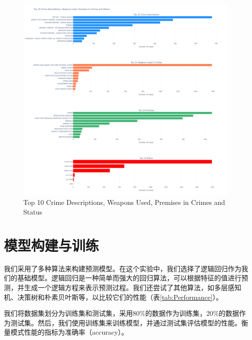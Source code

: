 \documentclass{article}
\begin{document}
\begin{figure}[H]
    \centering
    \includegraphics[width=1\textwidth]{../pic/top10.png}
    \caption{Top 10 Crime Descriptions, Weapons Used, Premises in Crimes and Status}
    \label{fig:top10}
\end{figure}

\section{模型构建与训练}
我们采用了多种算法来构建预测模型。在这个实验中，我们选择了逻辑回归作为我们的基础模型。逻辑回归是一种简单而强大的回归算法，可以根据特征的值进行预测，并生成一个逻辑方程来表示预测过程。我们还尝试了其他算法，如多层感知机、决策树和朴素贝叶斯等，以比较它们的性能（表\ref{tab:Performance}）。

我们将数据集划分为训练集和测试集，采用80\%的数据作为训练集，20\%的数据作为测试集。然后，我们使用训练集来训练模型，并通过测试集评估模型的性能。衡量模式性能的指标为准确率（accuracy）。
\end{document}
